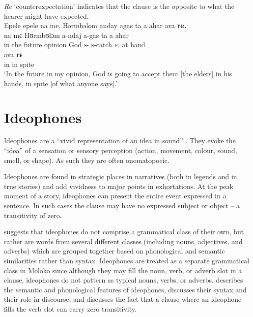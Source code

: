 \textit{Re} ‘counterexpectation’  indicates that the clause is the opposite to what the hearer might have expected.  
\clearpage
\ea \label{ex:3:130}\\
Epele  epele  na  me,  Hərmbəlom  anday  agas  ta  a  ahar  ava  \textbf{re.}\\
   na   mɛ  Hʊrmbʊlɔm   a-ndaj       a-gas   ta  a   ahar  \\
      {in the future}  {\PSP}  opinion  God      \textsc{s}-{\PROG}    \textsc{s}-catch   \textsc{p}.{\DO}  at  hand \\
\medskip
\gll ava   \textbf{rɛ}\\
      in     {in spite}\\
\glt  ‘In the future in my opinion, God is going to accept them [the elders] in his hands, in spite [of what anyone says].’
\z

\section{Ideophones}\label{sec:3.6}\largerpage
\hypertarget{RefHeading1211241525720847}{}
Ideophones are a “vivid representation of an idea in sound” \citep[118]{Doke1935}. They evoke the ``idea'' of a sensation or sensory perception (action, movement, colour, sound, smell, or shape). As such they are often onomatopoeic. 

Ideophones are found in strategic places in narratives (both in legends and in true stories) and add vividness to major points in exhortations. At the peak moment of a story, ideophones can present the entire event expressed in a sentence. In such cases the clause may have no expressed subject or object – a transitivity of zero.

\citet{Newman1968} suggests that ideophones do not comprise a grammatical class of their own, but rather are words from several different classes (including nouns, adjectives, and adverbs) which are grouped together based on phonological and semantic similarities rather than syntax. Ideophones are treated as a separate grammatical class in Moloko since although they may fill the noun, verb, or adverb slot in a clause, ideophones do not pattern as typical nouns, verbs, or adverbs.  describes the semantic and phonological features of ideophones,  discusses their syntax and their role in discourse, and  discusses the fact that a clause where an ideophone fills the verb slot can carry zero transitivity.  

